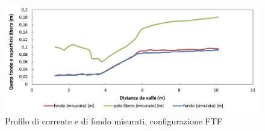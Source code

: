\documentclass[12pt]{article} %
\begin{document}
\begin{figure}[H]
    \centering
    \includegraphics[width=\textwidth]{FTFbase.png}
    \caption{Profilo di corrente e di fondo misurati, configurazione FTF}
    \label{fig:profilo_FTF}
\end{figure}
\end{document}
